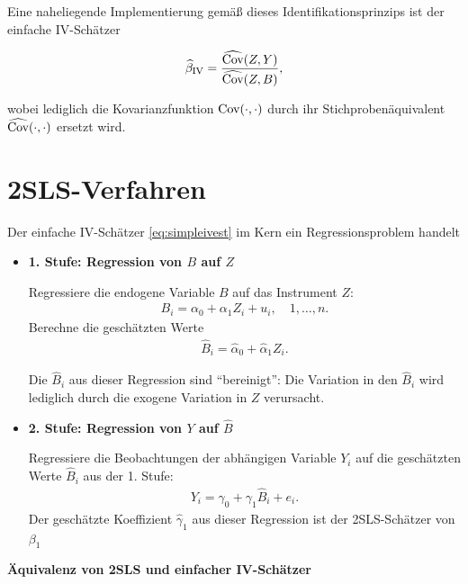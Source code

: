 \documentclass[
  a4paper,
  DIV=11,
  oneside]{scrreprt}
\begin{document}
Eine naheliegende Implementierung gemäß dieses Identifikationsprinzips
ist der einfache IV-Schätzer

\begin{align}
  \widehat{\beta}_{\textup{IV}} = \frac{\widehat{\textup{Cov}}(Z,Y) }{\widehat{\textup{Cov}}(Z,B)}, \label{eq:simpleivest}
\end{align}

wobei lediglich die Kovarianzfunktion \(\textup{Cov}(\cdot,\cdot)\)
durch ihr Stichprobenäquivalent \(\widehat{\textup{Cov}}(\cdot,\cdot)\)
ersetzt wird.

\section{2SLS-Verfahren}\label{sls-verfahren}

Der einfache IV-Schätzer \eqref{eq:simpleivest} im Kern ein
Regressionsproblem handelt

\begin{itemize}
\item
  \textbf{1. Stufe: Regression von \(B\) auf \(Z\)}

  Regressiere die endogene Variable \(B\) auf das Instrument \(Z\):
  \begin{align}
      B_i = \alpha_0 + \alpha_1 Z_i + u_i, \quad 1,\dots,n.
    \end{align} Berechne die geschätzten Werte \begin{align}
      \widehat{B}_i = \widehat{\alpha}_0 + \widehat{\alpha}_1 Z_i.
    \end{align}

  Die \(\widehat{B}_i\) aus dieser Regression sind ``bereinigt'': Die
  Variation in den \(\widehat{B}_i\) wird lediglich durch die exogene
  Variation in \(Z\) verursacht.
\item
  \textbf{2. Stufe: Regression von \(Y\) auf \(\widehat{B}\)}

  Regressiere die Beobachtungen der abhängigen Variable \(Y_i\) auf die
  geschätzten Werte \(\widehat{B}_i\) aus der 1. Stufe: \begin{align}
      Y_i = \gamma_0 + \gamma_1 \widehat{B}_i + e_i.
    \end{align} Der geschätzte Koeffizient \(\widehat{\gamma}_1\) aus
  dieser Regression ist der 2SLS-Schätzer von \(\beta_1\)
\end{itemize}

\textbf{Äquivalenz von 2SLS und einfacher IV-Schätzer}
\end{document}

